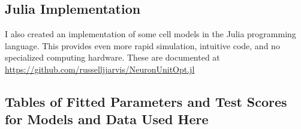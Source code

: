 


\subsection{Julia Implementation}
I also created an implementation of some cell models in the Julia programming language.
This provides even more rapid simulation, intuitive code, and no specialized computing hardware.
These are documented at
\url{https://github.com/russelljjarvis/NeuronUnitOpt.jl}


\subsection{Tables of Fitted Parameters and Test Scores for Models and Data Used Here}

